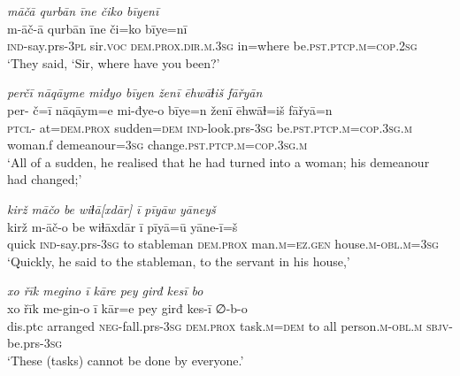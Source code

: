 \ea \label{ŠJ.30}
\textit{māčā qurbān īne čiko bīyenī} \\ 
\gll m-āč-ā qurbān īne či=ko bīye=nī \\ 
 \textsc{ind-}say.prs\textsc{-3pl} sir.\textsc{voc} \textsc{dem.prox}\textsc{.dir}\textsc{.m}\textsc{.3sg} in=where be\textsc{.pst}\textsc{.ptcp}\textsc{.m}\textsc{=cop}\textsc{.\textsc{2sg}} \\ 
\glt `They said, ‘Sir, where have you been?'
\z 
 
\ea \label{ŠJ.48}
\textit{perčī nāqāyme miđyo bīyen ženī ēhwāɫiš fāřyān} \\ 
\gll per- č=ī nāqāym=e mi-đye-o bīye=n ženī ēhwāɫ=iš fāřyā=n \\ 
 \textsc{ptcl}- at=\textsc{dem.prox} sudden\textsc{=dem} \textsc{ind-}look.prs\textsc{-3sg} be\textsc{.pst}\textsc{.ptcp}\textsc{.m}\textsc{=cop}\textsc{.3sg}\textsc{.m} woman.f demeanour\textsc{=3sg} change\textsc{.pst}\textsc{.ptcp}\textsc{.m}\textsc{=cop}\textsc{.3sg}\textsc{.m} \\ 
\glt `All of a sudden, he realised that he had turned into a woman; his demeanour had changed;'
\z 
 
\ea \label{ŠJ.51}
\textit{kirž māčo be wiɫā[xdār] ī pīyāw yāneyš} \\ 
\gll kirž m-āč-o be wiɫāxdār ī pīyā=ū yāne-ī=š \\ 
 quick \textsc{ind-}say.prs\textsc{-3sg} to stableman \textsc{dem.prox} man\textsc{.m}\textsc{=ez.gen} house\textsc{.m}\textsc{-obl}\textsc{.m}\textsc{=3sg} \\ 
\glt `Quickly, he said to the stableman, to the servant in his house,'
\z 
 
\ea \label{ŠJ.90}
\textit{xo řīk megino ī kāre pey girđ kesī bo} \\ 
\gll xo řīk me-gin-o ī kār=e pey girđ kes-ī ∅-b-o \\ 
 dis.ptc arranged \textsc{neg-}fall.prs\textsc{-3sg} \textsc{dem.prox} task\textsc{.m}\textsc{=dem} to all person\textsc{.m}\textsc{-obl}\textsc{.m} \textsc{sbjv-}be.prs\textsc{-3sg} \\ 
\glt `These (tasks) cannot be done by everyone.'
\z 
 
